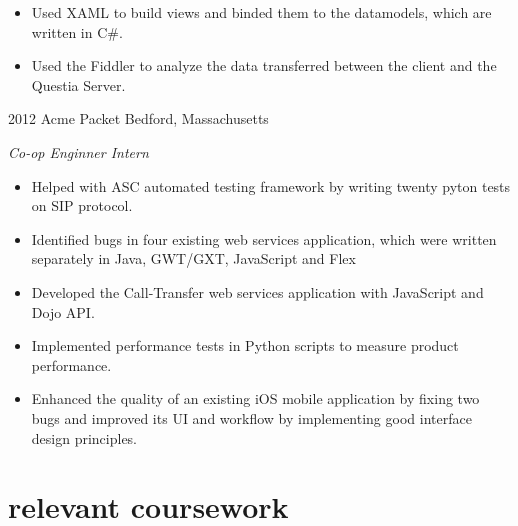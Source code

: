 \documentclass[]{ly-cv} %
\begin{document}
\begin{entrylist}
{\begin{itemize}
  \item Used XAML to build views and binded them to the datamodels, which are written in C\#.
  \item Used the Fiddler to analyze the data transferred between the client and the Questia Server.
\end{itemize}}
\entry
{2012}
{Acme Packet}
{Bedford, Massachusetts}
{\emph{Co-op Enginner Intern}
\begin{itemize}
  \item Helped with ASC automated testing framework by writing twenty pyton tests on SIP protocol.
	\item Identified bugs in four existing web services application, which were written separately in Java, GWT/GXT, JavaScript and Flex
  \item Developed the Call-Transfer web services application with JavaScript and Dojo API.
	\item Implemented performance tests in Python scripts to measure product performance.
  \item Enhanced the quality of an existing iOS mobile application by fixing two bugs and improved its UI and workflow by implementing good interface design principles.
\end{itemize}}

\end{entrylist}


\section{relevant coursework}
\end{document}
